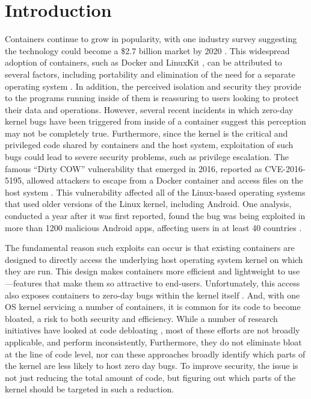\section{Introduction}
\label{sec.introduction}
Containers continue to grow in popularity, with one industry survey suggesting the technology could become a \$2.7 billion market by 2020 \cite{451-Research}. 
This widespread adoption of containers, such as Docker \cite{Docker} and LinuxKit \cite{LinuxKit}, can be attributed to several factors, 
including portability and elimination of the need for a separate operating system \cite{what-containers-do}.
In addition, the perceived isolation and security they provide to the programs running inside of them is reassuring to users looking to protect their data and operations. 
However, several recent incidents in which zero-day kernel bugs have been triggered from inside of a container \cite{containers-kernel-bug-tcp, containers-runc-vulnerability} 
suggest this perception may not be completely true. 
Furthermore, since the kernel is the critical and privileged code shared by containers and the host system, exploitation of such bugs could lead to severe security problems, 
such as privilege escalation. 
The famous ``Dirty COW'' vulnerability that emerged in 2016, reported as CVE-2016-5195, allowed attackers to escape from a Docker container and access files 
on the host system \cite{dirty-cow}. 
This vulnerability affected all of the Linux-based operating systems that used older versions of the Linux kernel, including Android. 
One analysis, conducted a year after it was first reported, found the bug was being exploited in more than 1200 malicious Android apps, affecting users in at least 40 countries \cite{dirty-cow-impact}. 

The fundamental reason such exploits can occur is that existing containers are designed to directly access the underlying host operating system kernel on which they are run. 
This design makes containers more efficient and lightweight to use—features that make them so attractive to end-users. 
Unfortunately, this access also exposes containers to zero-day bugs within the kernel itself \cite{containers-kernel-bug-tcp}. And, with one OS kernel servicing a number of containers, 
it is common for its code to become bloated, a risk to both security and efficiency. 
While a number of research initiatives have looked at code debloating \cite{DBLP:conf/ccs/GhaffariniaH19, Debloating-Software, RAZOR, Kernel-Debloating}, 
most of these efforts are not broadly applicable, and perform inconsistently, 
Furthermore, they do not eliminate bloat at the line of code level, nor can these approaches broadly identify which parts of the kernel are less likely to host zero day bugs. 
To improve security, the issue is not just reducing the total amount of code, but figuring out which parts of the kernel should be targeted in such a reduction. 

